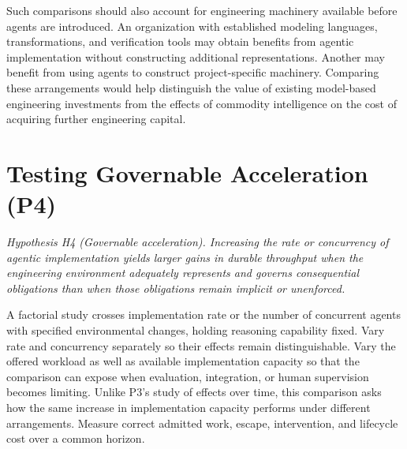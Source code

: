 Such comparisons should also account for engineering machinery available before agents are introduced. An organization with established modeling languages, transformations, and verification tools may obtain benefits from agentic implementation without constructing additional representations. Another may benefit from using agents to construct project-specific machinery. Comparing these arrangements would help distinguish the value of existing model-based engineering investments from the effects of commodity intelligence on the cost of acquiring further engineering capital.

\section{Testing Governable Acceleration (P4)}\label{heading:capacity-and-environment}

\emph{Hypothesis H4 (Governable acceleration). Increasing the rate or concurrency of agentic implementation yields larger gains in durable throughput when the engineering environment adequately represents and governs consequential obligations than when those obligations remain implicit or unenforced.}


A factorial study crosses implementation rate or the number of concurrent agents with specified environmental changes, holding reasoning capability fixed. Vary rate and concurrency separately so their effects remain distinguishable. Vary the offered workload as well as available implementation capacity so that the comparison can expose when evaluation, integration, or human supervision becomes limiting. Unlike P3's study of effects over time, this comparison asks how the same increase in implementation capacity performs under different arrangements. Measure correct admitted work, escape, intervention, and lifecycle cost over a common horizon.


